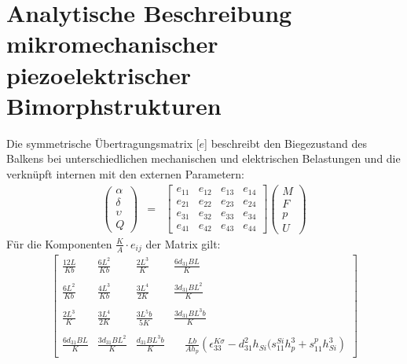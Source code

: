 
\section[Aktoren]
{Analytische Beschreibung mikromechanischer piezoelektrischer Bimorphstrukturen}

Die symmetrische Übertragungsmatrix [$e$] beschreibt den Biegezustand
des Balkens bei unterschiedlichen mechanischen und elektrischen
Belastungen und die verknüpft internen mit den externen Parametern:
%
\begin{eqnarray*}
  \left(
  \begin{array}{c}
  \alpha \\ \delta \\ \upsilon \\ Q
  \end{array} \right) & = &
  \left[
  \begin{array}{llll}
  e_{11} & e_{12} & e_{13} & e_{14} \\
  e_{21} & e_{22} & e_{23} & e_{24} \\
  e_{31} & e_{32} & e_{33} & e_{34} \\
  e_{41} & e_{42} & e_{43} & e_{44}
  \end{array}
 \right]
 \left(
 \begin{array}{c}
 M \\ F \\ p \\ U
 \end{array}
\right)
\end{eqnarray*}
%
Für die Komponenten $\displaystyle \frac{K}{A} \cdot e_{ij}$ der Matrix gilt:
%
\begin{eqnarray*}
\left [
\begin{array}{cccc}
\displaystyle \frac{12L}{Kb} & \displaystyle \frac{6L^{2}}{Kb} &
\displaystyle \frac{2L^{3}}{K} & \frac{6d_{31}BL}{K} \\
\\
\displaystyle \frac{6L^{2}}{Kb} & \displaystyle \frac{4L^{3}}{Kb} &
\displaystyle \frac{3L^{4}}{2K} &
               \displaystyle \frac{3d_{31}BL^{2}}{K}\\
\\
\displaystyle \frac{2L^{3}}{K} & \displaystyle \frac{3L^{4}}{2K} &
\displaystyle \frac{3L^{5}b}{5K} & \displaystyle
\frac{3d_{31}BL^{3}b}{K}\\
\\
\displaystyle \frac{6d_{31}BL}{K}     &
\displaystyle \frac{3d_{31}BL^{2}}{K} &
\displaystyle \frac{d_{31}BL^{3}b}{K} &
\quad \displaystyle \frac{Lb}{Ah_{p}} %
\left( \epsilon^{K \sigma}_{33} -
d_{31}^{2} h_{Si} (s^{Si}_{11} h_{p}^{3} +
s^{p}_{11} h_{Si}^{3}  \right)
\end{array}
\right ]
\end{eqnarray*}
